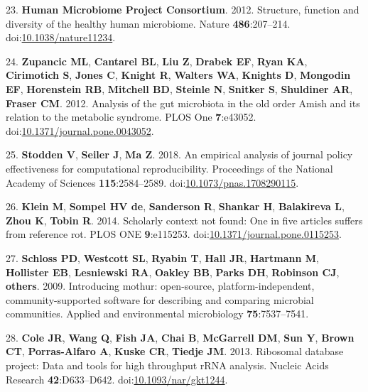 \documentclass[]{article}
\begin{document}
\hypertarget{ref-HMP2012}{}
23. \textbf{Human Microbiome Project Consortium}. 2012. Structure,
function and diversity of the healthy human microbiome. Nature
\textbf{486}:207--214.
doi:\href{https://doi.org/10.1038/nature11234}{10.1038/nature11234}.

\hypertarget{ref-Zupancic2012}{}
24. \textbf{Zupancic ML}, \textbf{Cantarel BL}, \textbf{Liu Z},
\textbf{Drabek EF}, \textbf{Ryan KA}, \textbf{Cirimotich S},
\textbf{Jones C}, \textbf{Knight R}, \textbf{Walters WA},
\textbf{Knights D}, \textbf{Mongodin EF}, \textbf{Horenstein RB},
\textbf{Mitchell BD}, \textbf{Steinle N}, \textbf{Snitker S},
\textbf{Shuldiner AR}, \textbf{Fraser CM}. 2012. Analysis of the gut
microbiota in the old order Amish and its relation to the metabolic
syndrome. PLOS One \textbf{7}:e43052.
doi:\href{https://doi.org/10.1371/journal.pone.0043052}{10.1371/journal.pone.0043052}.

\hypertarget{ref-Stodden2018}{}
25. \textbf{Stodden V}, \textbf{Seiler J}, \textbf{Ma Z}. 2018. An
empirical analysis of journal policy effectiveness for computational
reproducibility. Proceedings of the National Academy of Sciences
\textbf{115}:2584--2589.
doi:\href{https://doi.org/10.1073/pnas.1708290115}{10.1073/pnas.1708290115}.

\hypertarget{ref-Klein2014}{}
26. \textbf{Klein M}, \textbf{Sompel HV de}, \textbf{Sanderson R},
\textbf{Shankar H}, \textbf{Balakireva L}, \textbf{Zhou K},
\textbf{Tobin R}. 2014. Scholarly context not found: One in five
articles suffers from reference rot. PLOS ONE \textbf{9}:e115253.
doi:\href{https://doi.org/10.1371/journal.pone.0115253}{10.1371/journal.pone.0115253}.

\hypertarget{ref-Schloss2009}{}
27. \textbf{Schloss PD}, \textbf{Westcott SL}, \textbf{Ryabin T},
\textbf{Hall JR}, \textbf{Hartmann M}, \textbf{Hollister EB},
\textbf{Lesniewski RA}, \textbf{Oakley BB}, \textbf{Parks DH},
\textbf{Robinson CJ}, \textbf{others}. 2009. Introducing mothur:
open-source, platform-independent, community-supported software for
describing and comparing microbial communities. Applied and
environmental microbiology \textbf{75}:7537--7541.

\hypertarget{ref-Cole2013}{}
28. \textbf{Cole JR}, \textbf{Wang Q}, \textbf{Fish JA}, \textbf{Chai
B}, \textbf{McGarrell DM}, \textbf{Sun Y}, \textbf{Brown CT},
\textbf{Porras-Alfaro A}, \textbf{Kuske CR}, \textbf{Tiedje JM}. 2013.
Ribosomal database project: Data and tools for high throughput rRNA
analysis. Nucleic Acids Research \textbf{42}:D633--D642.
doi:\href{https://doi.org/10.1093/nar/gkt1244}{10.1093/nar/gkt1244}.
\end{document}
